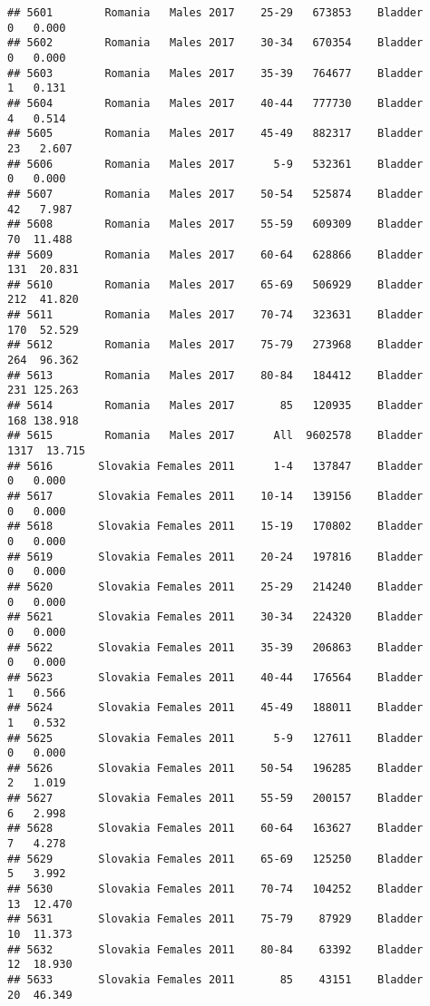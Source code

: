 \documentclass[
]{article}
\begin{document}
\begin{verbatim}
## 5601        Romania   Males 2017    25-29   673853    Bladder      0   0.000
## 5602        Romania   Males 2017    30-34   670354    Bladder      0   0.000
## 5603        Romania   Males 2017    35-39   764677    Bladder      1   0.131
## 5604        Romania   Males 2017    40-44   777730    Bladder      4   0.514
## 5605        Romania   Males 2017    45-49   882317    Bladder     23   2.607
## 5606        Romania   Males 2017      5-9   532361    Bladder      0   0.000
## 5607        Romania   Males 2017    50-54   525874    Bladder     42   7.987
## 5608        Romania   Males 2017    55-59   609309    Bladder     70  11.488
## 5609        Romania   Males 2017    60-64   628866    Bladder    131  20.831
## 5610        Romania   Males 2017    65-69   506929    Bladder    212  41.820
## 5611        Romania   Males 2017    70-74   323631    Bladder    170  52.529
## 5612        Romania   Males 2017    75-79   273968    Bladder    264  96.362
## 5613        Romania   Males 2017    80-84   184412    Bladder    231 125.263
## 5614        Romania   Males 2017       85   120935    Bladder    168 138.918
## 5615        Romania   Males 2017      All  9602578    Bladder   1317  13.715
## 5616       Slovakia Females 2011      1-4   137847    Bladder      0   0.000
## 5617       Slovakia Females 2011    10-14   139156    Bladder      0   0.000
## 5618       Slovakia Females 2011    15-19   170802    Bladder      0   0.000
## 5619       Slovakia Females 2011    20-24   197816    Bladder      0   0.000
## 5620       Slovakia Females 2011    25-29   214240    Bladder      0   0.000
## 5621       Slovakia Females 2011    30-34   224320    Bladder      0   0.000
## 5622       Slovakia Females 2011    35-39   206863    Bladder      0   0.000
## 5623       Slovakia Females 2011    40-44   176564    Bladder      1   0.566
## 5624       Slovakia Females 2011    45-49   188011    Bladder      1   0.532
## 5625       Slovakia Females 2011      5-9   127611    Bladder      0   0.000
## 5626       Slovakia Females 2011    50-54   196285    Bladder      2   1.019
## 5627       Slovakia Females 2011    55-59   200157    Bladder      6   2.998
## 5628       Slovakia Females 2011    60-64   163627    Bladder      7   4.278
## 5629       Slovakia Females 2011    65-69   125250    Bladder      5   3.992
## 5630       Slovakia Females 2011    70-74   104252    Bladder     13  12.470
## 5631       Slovakia Females 2011    75-79    87929    Bladder     10  11.373
## 5632       Slovakia Females 2011    80-84    63392    Bladder     12  18.930
## 5633       Slovakia Females 2011       85    43151    Bladder     20  46.349

\end{verbatim}
\end{document}
